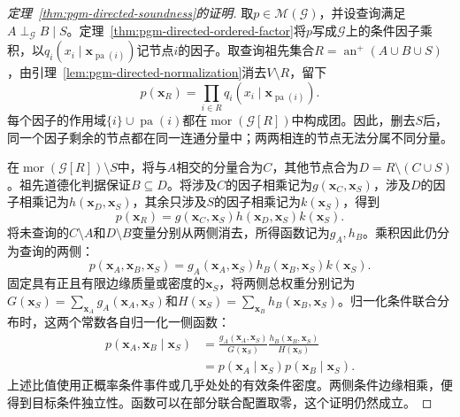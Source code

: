 \begin{proof}[定理~\ref{thm:pgm-directed-soundness}的证明]
取$p\in\mathcal{M}(\mathcal{G})$，并设查询满足$A\perp_{\mathcal{G}}B\mid S$。定理~\ref{thm:pgm-directed-ordered-factor}将$p$写成$\mathcal{G}$上的条件因子乘积，以$q_i(x_i\mid\bm{x}_{\operatorname{pa}(i)})$记节点$i$的因子。取查询祖先集合$R=\operatorname{an}^{+}(A\cup B\cup S)$，由引理~\ref{lem:pgm-directed-normalization}消去$V\setminus R$，留下
\[
  p(\bm{x}_R)=
  \prod_{i\in R}q_i(x_i\mid\bm{x}_{\operatorname{pa}(i)}).
\]
每个因子的作用域$\{i\}\cup\operatorname{pa}(i)$都在$\operatorname{mor}(\mathcal{G}[R])$中构成团。因此，删去$S$后，同一个因子剩余的节点都在同一连通分量中；两两相连的节点无法分属不同分量。

在$\operatorname{mor}(\mathcal{G}[R])\setminus S$中，将与$A$相交的分量合为$C$，其他节点合为$D=R\setminus(C\cup S)$。祖先道德化判据保证$B\subseteq D$。将涉及$C$的因子相乘记为$g(\bm{x}_C,\bm{x}_S)$，涉及$D$的因子相乘记为$h(\bm{x}_D,\bm{x}_S)$，其余只涉及$S$的因子相乘记为$k(\bm{x}_S)$，得到
\[
  p(\bm{x}_R)=
  g(\bm{x}_C,\bm{x}_S)
  h(\bm{x}_D,\bm{x}_S)
  k(\bm{x}_S).
\]
将未查询的$C\setminus A$和$D\setminus B$变量分别从两侧消去，所得函数记为$g_A,h_B$。乘积因此仍分为查询的两侧：
\[
  p(\bm{x}_A,\bm{x}_B,\bm{x}_S)=
  g_A(\bm{x}_A,\bm{x}_S)
  h_B(\bm{x}_B,\bm{x}_S)
  k(\bm{x}_S).
\]
固定具有正且有限边缘质量或密度的$\bm{x}_S$，将两侧总权重分别记为$G(\bm{x}_S)=\sum_{\bm{x}_A}g_A(\bm{x}_A,\bm{x}_S)$和$H(\bm{x}_S)=\sum_{\bm{x}_B}h_B(\bm{x}_B,\bm{x}_S)$。归一化条件联合分布时，这两个常数各自归一化一侧函数：
\[
  \begin{aligned}
    p(\bm{x}_A,\bm{x}_B\mid\bm{x}_S)
      &=\frac{g_A(\bm{x}_A,\bm{x}_S)}{G(\bm{x}_S)}
        \frac{h_B(\bm{x}_B,\bm{x}_S)}{H(\bm{x}_S)}\\
      &=p(\bm{x}_A\mid\bm{x}_S)
        p(\bm{x}_B\mid\bm{x}_S).
  \end{aligned}
\]
上述比值使用正概率条件事件或几乎处处的有效条件密度。两侧条件边缘相乘，便得到目标条件独立性。函数可以在部分联合配置取零，这个证明仍然成立。
\end{proof}

